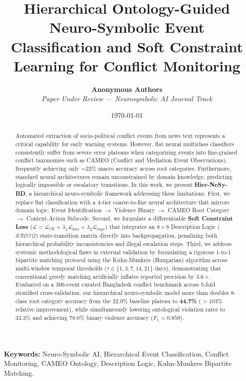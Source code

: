 \documentclass[11pt,a4paper]{article}
\title{\textbf{Hierarchical Ontology-Guided Neuro-Symbolic Event Classification and Soft Constraint Learning for Conflict Monitoring}}
\author{
  \textbf{Anonymous Authors} \\
  \textit{Paper Under Review --- Neurosymbolic AI Journal Track}
}
\date{\today}
\begin{document}
\maketitle

\begin{abstract}
Automated extraction of socio-political conflict events from news text represents a critical capability for early warning systems. However, flat neural multiclass classifiers consistently suffer from severe error plateaus when categorizing events into fine-grained conflict taxonomies such as CAMEO (Conflict and Mediation Event Observations), frequently achieving only $\sim$22\% macro accuracy across root categories. Furthermore, standard neural architectures remain unconstrained by domain knowledge, predicting logically impossible or escalatory transitions. In this work, we present \textbf{Hier-NeSy-BD}, a hierarchical neuro-symbolic framework addressing these limitations. First, we replace flat classification with a 4-tier coarse-to-fine neural architecture that mirrors domain logic: Event Identification $\to$ Violence Binary $\to$ CAMEO Root Category $\to$ Context-Action Subcode. Second, we formulate a differentiable \textbf{Soft Constraint Loss} ($\mathcal{L} = \mathcal{L}_{\text{CE}} + \lambda_1 \mathcal{L}_{\text{hier}} + \lambda_2 \mathcal{L}_{\text{logic}}$) that integrates an $8 \times 8$ Description Logic ($\mathcal{SROIQ}$) state-transition matrix directly into backpropagation, penalizing both hierarchical probability inconsistencies and illegal escalation steps. Third, we address systemic methodological flaws in external validation by formulating a rigorous 1-to-1 bipartite matching protocol using the Kuhn-Munkres (Hungarian) algorithm across multi-window temporal thresholds ($\tau \in \{1, 3, 7, 14, 21\}$ days), demonstrating that conventional greedy matching artificially inflates reported precision by $3.6\times$. Evaluated on a 300-event curated Bangladesh conflict benchmark across 5-fold stratified cross-validation, our hierarchical neuro-symbolic model more than doubles 8-class root category accuracy from the 22.0\% baseline plateau to \textbf{44.7\%} ($>103\%$ relative improvement), while simultaneously lowering ontological violation rates to 33.3\% and achieving 78.0\% binary violence accuracy ($F_1 = 0.859$).
\end{abstract}

\noindent\textbf{Keywords:} Neuro-Symbolic AI, Hierarchical Event Classification, Conflict Monitoring, CAMEO Ontology, Description Logic, Kuhn-Munkres Bipartite Matching.
\end{document}
